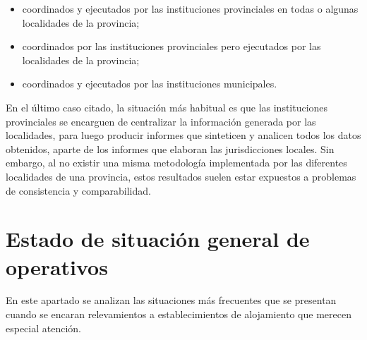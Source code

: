 \documentclass[
]{book}
\begin{document}
\begin{itemize}
\item
  coordinados y ejecutados por las instituciones provinciales en todas o algunas localidades de la provincia;
\item
  coordinados por las instituciones provinciales pero ejecutados por las localidades de la provincia;
\item
  coordinados y ejecutados por las instituciones municipales.
\end{itemize}

En el último caso citado, la situación más habitual es que las instituciones provinciales se encarguen de centralizar la información generada por las localidades, para luego producir informes que sinteticen y analicen todos los datos obtenidos, aparte de los informes que elaboran las jurisdicciones locales. Sin embargo, al no existir una misma metodología implementada por las diferentes localidades de una provincia, estos resultados suelen estar expuestos a problemas de consistencia y comparabilidad.

\hypertarget{estado-de-situaciuxf3n-general-de-operativos}{%
\section{Estado de situación general de operativos}\label{estado-de-situaciuxf3n-general-de-operativos}}

En este apartado se analizan las situaciones más frecuentes que se presentan cuando se encaran relevamientos a establecimientos de alojamiento que merecen especial atención.
\end{document}
